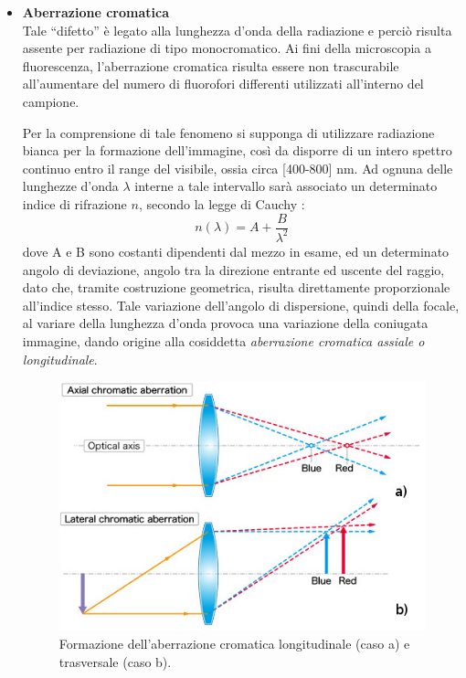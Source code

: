 \begin{itemize}
\item \textbf{Aberrazione cromatica}\\
Tale ``difetto'' è legato alla lunghezza d'onda della radiazione e perciò risulta assente per radiazione di tipo monocromatico. 
Ai fini della microscopia a fluorescenza, l'aberrazione cromatica risulta essere non trascurabile all'aumentare del numero di fluorofori differenti utilizzati all'interno del campione.

Per la comprensione di tale fenomeno si supponga di utilizzare radiazione bianca per la formazione dell'immagine, così da disporre di un intero spettro continuo entro il range del visibile, ossia circa [400-800] nm. Ad ognuna delle lunghezze d'onda $\lambda$ interne a tale intervallo sarà associato un determinato indice di rifrazione $n$, secondo la legge di Cauchy \cite{nigro}:
$$n(\lambda) = A + \frac{B}{\lambda ^2}$$
dove A e B sono costanti dipendenti dal mezzo in esame, ed un determinato angolo di deviazione, angolo tra la direzione entrante ed uscente del raggio, dato che, tramite costruzione geometrica, risulta direttamente proporzionale all'indice stesso.
Tale variazione dell'angolo di dispersione, quindi della focale, al variare della lunghezza d'onda provoca una variazione della coniugata immagine, dando origine alla cosiddetta \textit{aberrazione cromatica assiale o longitudinale}. 

\begin{figure}
 \centering
 \includegraphics[scale=.50]{img/CAP2ac.jpg}
 \caption{\small{Formazione dell'aberrazione cromatica longitudinale (caso a) e trasversale (caso b).}}
 \label{fig:ac}
\end{figure}


\end{itemize}
